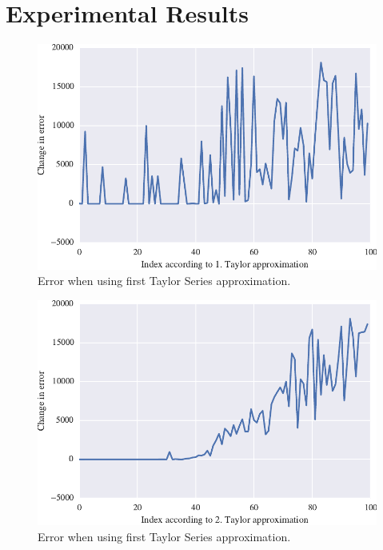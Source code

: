 \section{Experimental Results}

\begin{figure}
\centering
\includegraphics[width=0.6\linewidth]{error1.pdf}
\caption{Error when using first Taylor Series approximation.}
\label{fig:error1}

\end{figure}
\begin{figure}
\centering
\includegraphics[width=0.6\linewidth]{error2.pdf}
\caption{Error when using first Taylor Series approximation.}
\label{fig:error2}
\end{figure}
